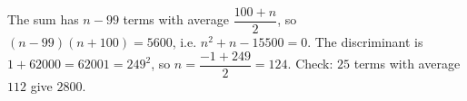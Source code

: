 The sum has $n-99$ terms with average $\dfrac{100+n}{2}$, so $(n-99)(n+100)=5600$, i.e. $n^2+n-15500=0$. The discriminant is $1+62000=62001=249^2$, so $n=\dfrac{-1+249}{2}=\boxed{124}$. Check: $25$ terms with average $112$ give $2800$.
